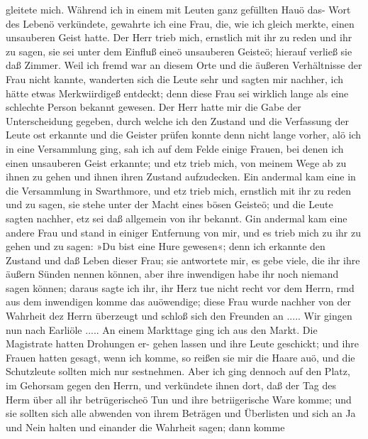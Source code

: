 gleitete mich. Während ich in einem mit Leuten ganz gefüllten
Hauö das- Wort des Lebenö verkündete, gewahrte ich eine Frau,
die, wie ich gleich merkte, einen unsauberen Geist hatte. Der
Herr trieb mich, ernstlich mit ihr zu reden und ihr zu sagen, sie
sei unter dem Einfluß eineö unsauberen Geisteö; hierauf verließ
sie daß Zimmer. Weil ich fremd war an diesem Orte und die
äußeren Verhältnisse der Frau nicht kannte, wanderten sich die
Leute sehr und sagten mir nachher, ich hätte etwas Merkwiirdigeß
entdeckt; denn diese Frau sei wirklich lange als eine schlechte
Person bekannt gewesen. Der Herr hatte mir die Gabe der
Unterscheidung gegeben, durch welche ich den Zustand und die
Verfassung der Leute ost erkannte und die Geister prüfen konnte
denn nicht lange vorher, alö ich in eine Versammlung ging, sah
ich auf dem Felde einige Frauen, bei denen ich einen unsauberen
Geist erkannte; und etz trieb mich, von meinem Wege ab zu ihnen
zu gehen und ihnen ihren Zustand aufzudecken. Ein andermal
kam eine in die Versammlung in Swarthmore, und etz trieb mich,
ernstlich mit ihr zu reden und zu sagen, sie stehe unter der Macht
eines bösen Geisteö; und die Leute sagten nachher, etz sei daß
allgemein von ihr bekannt. Gin andermal kam eine andere Frau
und stand in einiger Entfernung von mir, und es trieb mich zu
ihr zu gehen und zu sagen: »Du bist eine Hure gewesen«; denn
ich erkannte den Zustand und daß Leben dieser Frau; sie antwortete
mir, es gebe viele, die ihr ihre äußern Sünden nennen können,
aber ihre inwendigen habe ihr noch niemand sagen können; daraus
sagte ich ihr, ihr Herz tue nicht recht vor dem Herrn, rmd
aus dem inwendigen komme das auöwendige; diese Frau wurde
nachher von der Wahrheit dez Herrn überzeugt und schloß sich
den Freunden an .....
Wir gingen nun nach Earliöle ..... An einem Markttage
ging ich aus den Markt. Die Magistrate hatten Drohungen er-
gehen lassen und ihre Leute geschickt; und ihre Frauen hatten
gesagt, wenn ich komme, so reißen sie mir die Haare auö, und
die Schutzleute sollten mich nur sestnehmen. Aber ich ging dennoch
auf den Platz, im Gehorsam gegen den Herrn, und verkündete
ihnen dort, daß der Tag des Herm über all ihr betrügerischeö
Tun und ihre betriigerische Ware komme; und sie sollten sich alle
abwenden von ihrem Beträgen und Überlisten und sich an Ja
und Nein halten und einander die Wahrheit sagen; dann komme


